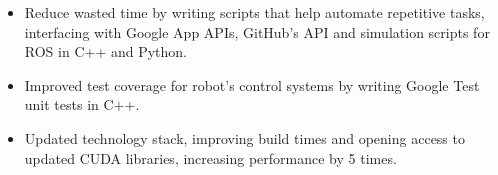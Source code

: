 \documentclass[10pt,a4paper,ragged2e,academicons]{altacv}
\begin{document}
\begin{paracol}{2}
  \begin{itemize}
    \item Reduce wasted time by writing scripts that help automate repetitive tasks, interfacing with Google App APIs, GitHub’s API and simulation scripts for ROS in C++ and Python.
    \item Improved test coverage for robot’s control systems by writing Google Test unit tests in C++.
    \item Updated technology stack, improving build times and opening access to updated CUDA libraries, increasing performance by 5 times.
  \end{itemize}
  \divider\small
\end{paracol}
\end{document}
